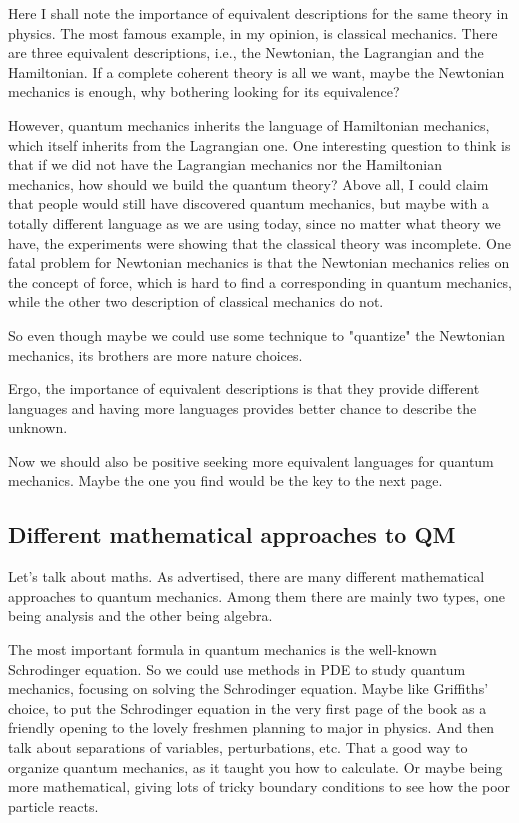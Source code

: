 Here I shall note the importance of equivalent descriptions for the same theory in physics. The most famous example, in my opinion, is classical mechanics. There are three equivalent descriptions, i.e., the Newtonian, the Lagrangian and the Hamiltonian. If a complete coherent theory is all we want, maybe the Newtonian mechanics is enough, why bothering looking for its equivalence?

However, quantum mechanics inherits the language of Hamiltonian mechanics, which itself inherits from the Lagrangian one. One interesting question to think is that if we did not have the Lagrangian mechanics nor the Hamiltonian mechanics, how should we build the quantum theory? Above all, I could claim that people would still have discovered quantum mechanics, but maybe with a totally different language as we are using today, since no matter what theory we have, the experiments were showing that the classical theory was incomplete. One fatal problem for Newtonian mechanics is that the Newtonian mechanics relies on the concept of force, which is hard to find a corresponding in quantum mechanics, while the other two description of classical mechanics do not.

So even though maybe we could use some technique to "quantize" the Newtonian mechanics, its brothers are more nature choices.

Ergo, the importance of equivalent descriptions is that they provide different languages and having more languages provides better chance to describe the unknown.

Now we should also be positive seeking more equivalent languages for quantum mechanics. Maybe the one you find would be the key to the next page.

\subsection{Different mathematical approaches to QM}
Let's talk about maths. As advertised, there are many different mathematical approaches to quantum mechanics. Among them there are mainly two types, one being analysis and the other being algebra.

The most important formula in quantum mechanics is the well-known Schrodinger equation. So we could use methods in PDE to study quantum mechanics, focusing on solving the Schrodinger equation. Maybe like Griffiths' choice, to put the Schrodinger equation in the very first page of the book as a friendly opening to the lovely freshmen planning to major in physics. And then talk about separations of variables, perturbations, etc. That a good way to organize quantum mechanics, as it taught you how to calculate. Or maybe being more mathematical, giving lots of tricky boundary conditions to see how the poor particle reacts.

